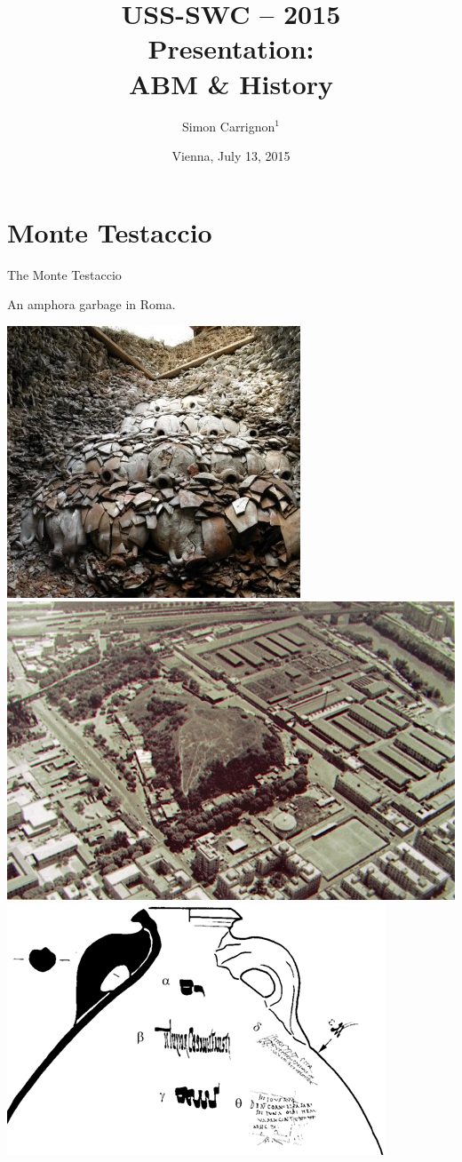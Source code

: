 \documentclass[8pt, handout=show,notes=show]{beamer}
\title{USS-SWC -- 2015\\
	Presentation:\\
	ABM \& History
}
\date{Vienna, July 13, 2015}
\author{Simon Carrignon$^1$}
\institute[]{
	$^1$Barcelona~Supercomputing~Center \\

}
\begin{document}
\begin{frame}
	\maketitle

\end{frame}

\section{Monte Testaccio}
\begin{frame}{The Monte Testaccio}

	An amphora garbage in Roma.\\

	\begin{center}
		\includegraphics[height=0.3\textwidth]{./Mount-Testaccio.jpg}
		\hfil \includegraphics[height=0.3\textwidth]{./Mount-Testaccio2.jpg}\\
		\vfill
		\includegraphics[height=0.3\textwidth]{./titulus.png}

	\end{center}

\end{frame}
\end{document}
